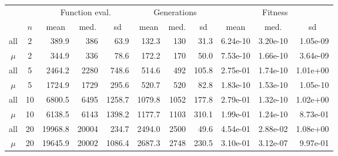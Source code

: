 {\renewcommand{\arraystretch}{1.1} \renewcommand{\tabcolsep}{0.1cm} %
\begin{tabular}{ c  c | rrr | rrr| rrr}
\toprule
 & & \multicolumn{3}{c|}{Function eval.} & \multicolumn{3}{c|}{Generations} & \multicolumn{3}{c}{Fitness} \\ 
     & $n$ & \multicolumn{1}{c}{mean} & \multicolumn{1}{c}{med.} & \multicolumn{1}{c|}{sd} & \multicolumn{1}{c}{mean} & \multicolumn{1}{c}{med.} & \multicolumn{1}{c|}{sd} & \multicolumn{1}{c}{mean} & \multicolumn{1}{c}{med.} & \multicolumn{1}{c}{sd} \\
\midrule
all & 2 & 389.9 & 386 & 63.9 & 132.3 & 130 & 31.3 & 6.24e-10 & 3.20e-10 & 1.05e-09\\ 
$\mu$ & 2 & 344.9 & 336 & 78.6 & 172.2 & 170 & 50.0 & 7.53e-10 & 1.66e-10 & 3.64e-09\\ \midrule
all & 5 & 2464.2 & 2280 & 748.6 & 514.6 & 492 & 105.8 & 2.75e-01 & 1.74e-10 & 1.01e+00\\ 
$\mu$ & 5 & 1724.9 & 1729 & 295.6 & 520.7 & 520 & 82.8 & 1.83e-10 & 1.53e-10 & 1.05e-10\\ \midrule
all & 10 & 6800.5 & 6495 & 1258.7 & 1079.8 & 1052 & 177.8 & 2.79e-01 & 1.32e-10 & 1.02e+00\\ 
$\mu$ & 10 & 6138.5 & 6143 & 1398.2 & 1177.7 & 1103 & 310.1 & 1.99e-01 & 1.24e-10 & 8.73e-01\\ \midrule
all & 20 & 19968.8 & 20004 & 234.7 & 2494.0 & 2500 & 49.6 & 4.54e-01 & 2.88e-02 & 1.08e+00\\ 
$\mu$ & 20 & 19645.9 & 20002 & 1086.4 & 2687.3 & 2748 & 230.5 & 3.10e-01 & 3.12e-07 & 9.97e-01\\ \bottomrule
\end{tabular}
}

